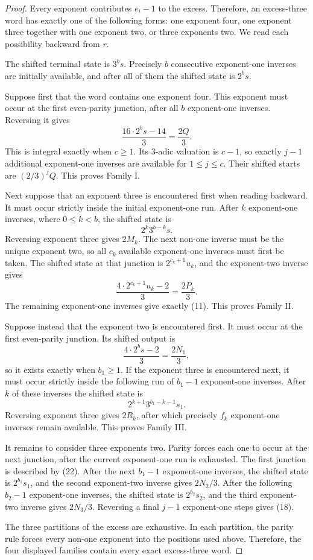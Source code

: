 \documentclass[11pt]{article}
\begin{document}
\begin{proof}
Every exponent contributes $e_i-1$ to the excess.  Therefore, an
excess-three word has exactly one of the following forms: one exponent
four, one exponent three together with one exponent two, or three
exponents two.  We read each possibility backward from $r$.

The shifted terminal state is $3^bs$.  Precisely $b$ consecutive
exponent-one inverses are initially available, and after all of them the
shifted state is $2^bs$.

Suppose first that the word contains one exponent four.  This exponent
must occur at the first even-parity junction, after all $b$
exponent-one inverses.  Reversing it gives
\[
 \frac{16\cdot2^bs-14}{3}=\frac{2Q}{3}.
 \tag{19}
\]
This is integral exactly when $c\geq1$.  Its $3$-adic valuation is
$c-1$, so exactly $j-1$ additional exponent-one inverses are available
for $1\leq j\leq c$.  Their shifted starts are $(2/3)^jQ$.  This proves
Family I.

Next suppose that an exponent three is encountered first when reading
backward.  It must occur strictly inside the initial exponent-one run.
After $k$ exponent-one inverses, where $0\leq k<b$, the shifted state is
\[
 2^k3^{b-k}s.
 \tag{20}
\]
Reversing exponent three gives $2M_k$.  The next non-one inverse must be
the unique exponent two, so all $c_k$ available exponent-one inverses
must first be taken.  The shifted state at that junction is
$2^{c_k+1}u_k$, and the exponent-two inverse gives
\[
 \frac{4\cdot2^{c_k+1}u_k-2}{3}=\frac{2P_k}{3}.
 \tag{21}
\]
The remaining exponent-one inverses give exactly (11).  This proves
Family II.

Suppose instead that the exponent two is encountered first.  It must
occur at the first even-parity junction.  Its shifted output is
\[
 \frac{4\cdot2^bs-2}{3}=\frac{2N_1}{3},
 \tag{22}
\]
so it exists exactly when $b_1\geq1$.  If the exponent three is
encountered next, it must occur strictly inside the following run of
$b_1-1$ exponent-one inverses.  After $k$ of these inverses the shifted
state is
\[
 2^{k+1}3^{b_1-k-1}s_1.
 \tag{23}
\]
Reversing exponent three gives $2R_k$, after which precisely $f_k$
exponent-one inverses remain available.  This proves Family III.

It remains to consider three exponents two.  Parity forces each one to
occur at the next junction, after the current exponent-one run is
exhausted.  The first junction is described by (22).  After the next
$b_1-1$ exponent-one inverses, the shifted state is $2^{b_1}s_1$, and
the second exponent-two inverse gives $2N_2/3$.  After the following
$b_2-1$ exponent-one inverses, the shifted state is $2^{b_2}s_2$, and
the third exponent-two inverse gives $2N_3/3$.  Reversing a final
$j-1$ exponent-one steps gives (18).

The three partitions of the excess are exhaustive.  In each partition,
the parity rule forces every non-one exponent into the positions used
above.  Therefore, the four displayed families contain every exact
excess-three word.
\end{proof}
\end{document}
